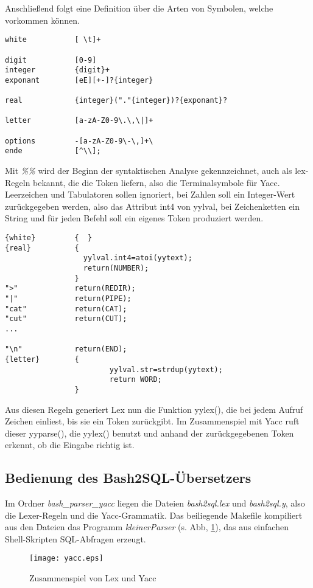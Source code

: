 Anschließend folgt eine Definition über die Arten von Symbolen, welche vorkommen können.
\begin{lstlisting}
white           [ \t]+

digit           [0-9]
integer         {digit}+
exponant        [eE][+-]?{integer}

real            {integer}("."{integer})?{exponant}?

letter          [a-zA-Z0-9\.\,\|]+

options         -[a-zA-Z0-9\-\,]+\ 
ende            [^\\];
\end{lstlisting}
Mit \textit{\%\%} wird der Beginn der syntaktischen Analyse gekennzeichnet, auch als lex-Regeln bekannt, die die Token liefern, also die Terminalsymbole für Yacc.
Leerzeichen und Tabulatoren sollen ignoriert, bei Zahlen soll ein Integer-Wert zurückgegeben werden, also das Attribut int4 von yylval, bei Zeichenketten ein String und für jeden Befehl soll ein eigenes Token produziert werden.
\begin{lstlisting}
{white}         {  }
{real}          {
                  yylval.int4=atoi(yytext);
                  return(NUMBER);
                }
">"             return(REDIR);
"|"             return(PIPE);
"cat"           return(CAT);
"cut"           return(CUT);
...

"\n"            return(END);
{letter}        {
                        yylval.str=strdup(yytext);
                        return WORD;
                }
\end{lstlisting}
Aus diesen Regeln generiert Lex nun die Funktion yylex(), die bei jedem Aufruf Zeichen einliest, bis sie ein Token zurückgibt. Im Zusammenspiel mit Yacc ruft dieser yyparse(), die yylex() benutzt und anhand der zurückgegebenen Token erkennt, ob die Eingabe richtig ist.

\subsection{Bedienung des Bash2SQL-Übersetzers}
Im Ordner \textit{bash\_parser\_yacc} liegen die Dateien \textit{bash2sql.lex} und \textit{bash2sql.y}, also die Lexer-Regeln und die Yacc-Grammatik. Das beiliegende Makefile kompiliert aus den Dateien das Programm \textit{kleinerParser} (s. Abb, \ref{fig:lexyacc}), das aus einfachen Shell-Skripten SQL-Abfragen erzeugt.

\begin{figure}[h]
\centering
\texttt{[image: yacc.eps]}
\caption{Zusammenspiel von Lex und Yacc}
\label{fig:lexyacc}
\end{figure}

